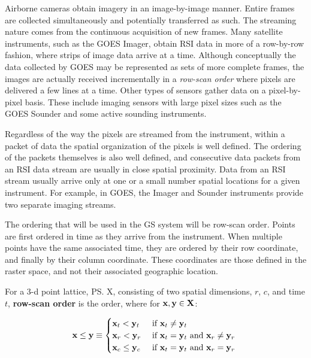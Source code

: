 \documentclass{ucdthesis}       %
\begin{document}
Airborne cameras obtain imagery in an image-by-image manner.  Entire
frames are collected simultaneously and potentially transferred as
such.  The streaming nature comes from the continuous acquisition of
new frames.  Many satellite instruments, such as the \ac{GOES} Imager,
obtain \acs{RSI} data in more of a row-by-row fashion, where strips of
image data arrive at a time.  Although conceptually the data collected
by \acs{GOES} may be represented as sets of more complete frames, the
images are actually received incrementally in a \emph{row-scan order}
where pixels are delivered a few lines at a time. Other types of
sensors gather data on a pixel-by-pixel basis.  These include imaging
sensors with large pixel sizes such as the \ac{GOES} Sounder and some
active sounding instruments.

Regardless of the way the pixels are streamed from the instrument,
within a packet of data the spatial organization of the pixels is well
defined.  The ordering of the packets themselves is also well defined,
and consecutive data packets from an \acs{RSI} data stream are usually
in close spatial proximity.  Data from an \acs{RSI} stream usually arrive only
at one or a small number spatial locations for a given instrument.
For example, in \ac{GOES}, the Imager and Sounder instruments provide
two separate imaging streams.

The ordering that will be used in the \ac{GS} system will be row-scan
order.  Points are first ordered in time as they arrive from the
instrument.  When multiple points have the same associated time, they
are ordered by their row coordinate, and finally by their column
coordinate.  These coordinates are those defined in the raster space,
and not their associated geographic location.

For a 3-d point lattice, \ps{X}, consisting of two spatial dimensions,
$r$, $c$, and time $t$, {\bf row-scan order} is the order, where for
${\bf{x}},{\bf{y}} \in {\ensuremath{\bf{X}}}$:

\begin{gather*}
  {\ensuremath{\bf{x}}} \le {\ensuremath{\bf{y}}} \equiv
  \begin{cases}
    {\ensuremath{\bf{x}}}_t < {\bf{y}}_t & \text{ if ${\bf{x}}_t \ne {\ensuremath{\bf{y}}}_t$ }\\
    {\bf{x}}_r < {\bf{y}}_r & \text{ if ${\bf{x}}_t = {\bf{y}}_t$ and ${\bf{x}}_r \ne {\ensuremath{\bf{y}}}_r$}  \\
    {\bf{x}}_c \le {\ensuremath{\bf{y}}}_c & \text{ if ${\bf{x}}_t = {\bf{y}}_t$ and
      ${\bf{x}}_r = {\bf{y}}_r$ }
  \end{cases} 
\end{gather*}
\end{document}
